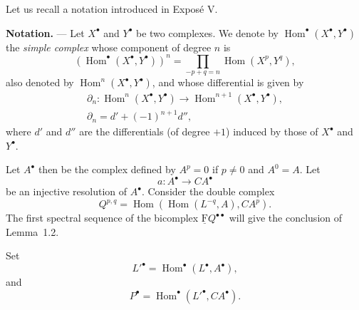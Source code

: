 \documentclass[10pt,a4paper]{article}
\newcommand{\uF}{\underline{\mathrm F}}
\newcommand{\cF}{\uF}
\theoremstyle{sgatheorem}
\theoremstyle{plain}
\numberwithin{equation}{section}
\begin{document}
Let us recall a notation introduced in Expos\'e V.

\medskip
\noindent\textbf{Notation.} --- Let $X^\bullet$ and $Y^\bullet$ be two
complexes. We denote by $\operatorname{Hom}^\bullet(X^\bullet,Y^\bullet)$ the
\emph{simple complex} whose component of degree $n$ is
\[
  (\operatorname{Hom}^\bullet(X^\bullet,Y^\bullet))^n
  =\prod_{-p+q=n}\operatorname{Hom}(X^p,Y^q),
\]
also denoted by $\operatorname{Hom}^n(X^\bullet,Y^\bullet)$, and whose
differential is given by
\begin{gather*}
  \partial_n\colon
  \operatorname{Hom}^n(X^\bullet,Y^\bullet)
  \longrightarrow
  \operatorname{Hom}^{n+1}(X^\bullet,Y^\bullet),\\
  \partial_n=d'+(-1)^{n+1}d'',
\end{gather*}
where $d'$ and $d''$ are the differentials (of degree $+1$) induced by those
of $X^\bullet$ and $Y^\bullet$.


\renewcommand{\theequation}{1.\arabic{equation}}\setcounter{equation}{1}

Let $A^\bullet$ then be the complex defined by $A^p=0$ if $p\ne 0$ and
$A^0=A$. Let
\[
  a\colon A^\bullet\longrightarrow CA^\bullet
\]
be an injective resolution of $A^\bullet$. Consider the double complex
\begin{equation}\label{eq:VIII.1.2}
  Q^{p,q}=\operatorname{Hom}(\operatorname{Hom}(L^{-q},A),CA^p).
\end{equation}
The first spectral sequence of the bicomplex $\cF Q^{\bullet\bullet}$ will
give the conclusion of Lemma~1.2.

Set
\begin{equation}\label{eq:VIII.1.3}
  {L'}^\bullet=\operatorname{Hom}^\bullet(L^\bullet,A^\bullet),
\end{equation}
and
\begin{equation}\label{eq:VIII.1.4}
  P^\bullet=\operatorname{Hom}^\bullet({L'}^\bullet,CA^\bullet).
\end{equation}


\renewcommand{\theequation}{1.\arabic{equation}}\setcounter{equation}{4}
\end{document}
